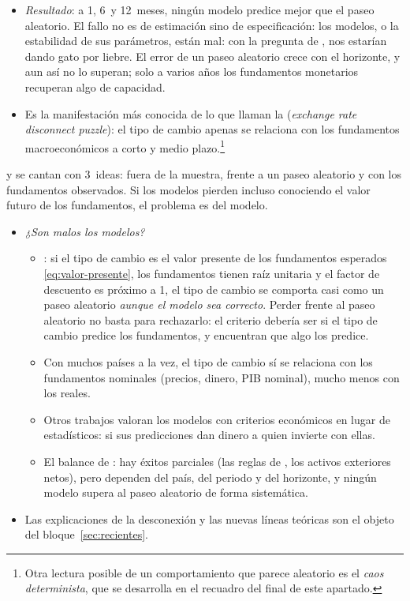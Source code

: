 \documentclass[11pt]{article}
\begin{document}
\begin{itemize}
\item \emph{Resultado}: a 1, 6~y 12~meses, ningún modelo predice mejor que el paseo aleatorio. El fallo no es de estimación sino de especificación: los modelos, o la estabilidad de sus parámetros, están mal: con la pregunta de , nos estarían dando gato por liebre. El error de un paseo aleatorio crece con el horizonte, y aun así no lo superan; solo a varios años los fundamentos monetarios recuperan algo de capacidad\nocite{Mark1995}.
\item Es la manifestación más conocida de lo que \textcite{ObstfeldRogoff2000Puzzles} llaman la  (\emph{exchange rate disconnect puzzle}): el tipo de cambio apenas se relaciona con los fundamentos macroeconómicos a corto y medio plazo.\footnote{Otra lectura posible de un comportamiento que parece aleatorio es el \emph{caos determinista}, que se desarrolla en el recuadro del final de este apartado.}
\end{itemize}

\begin{notaopositor}
 y  se cantan con 3~ideas: fuera de la muestra, frente a un paseo aleatorio y con los fundamentos observados. Si los modelos pierden incluso conociendo el valor futuro de los fundamentos, el problema es del modelo.
\end{notaopositor}

\begin{itemize}
\item \emph{¿Son malos los modelos?}
  \begin{itemize}
  \item \textcite{EngelWest2005}: si el tipo de cambio es el valor presente de los fundamentos esperados \eqref{eq:valor-presente}, los fundamentos tienen raíz unitaria y el factor de descuento es próximo a 1, el tipo de cambio se comporta casi como un paseo aleatorio \emph{aunque el modelo sea correcto}. Perder frente al paseo aleatorio no basta para rechazarlo: el criterio debería ser si el tipo de cambio predice los fundamentos, y encuentran que algo los predice.
  \item Con muchos países a la vez, el tipo de cambio sí se relaciona con los fundamentos nominales (precios, dinero, PIB nominal), mucho menos con los reales\nocite{SarnoSchmeling2014}.
  \item Otros trabajos valoran los modelos con criterios económicos en lugar de estadísticos: si sus predicciones dan dinero a quien invierte con ellas.
  \item El balance de \textcite{Rossi2013}: hay éxitos parciales (las reglas de , los activos exteriores netos), pero dependen del país, del periodo y del horizonte, y ningún modelo supera al paseo aleatorio de forma sistemática.
  \end{itemize}
\item Las explicaciones de la desconexión y las nuevas líneas teóricas son el objeto del bloque~\ref{sec:recientes}.
\end{itemize}
\end{document}
